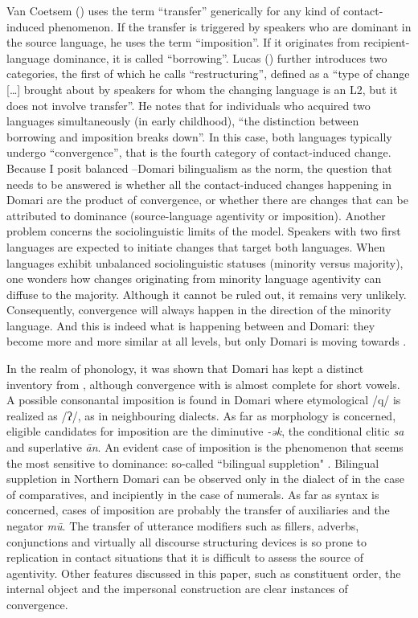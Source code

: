 \documentclass[output=paper]{langsci/langscibook}
\begin{document}
Van Coetsem (\citeyear{VanCoetsem1988,VanCoetsem2000}) uses the term “{transfer}” generically for any kind of contact-induced phenomenon. If the {transfer} is triggered by speakers who are dominant in the {source language}, he uses the term “{imposition}”. If it originates from {recipient-language} dominance, it is called “borrowing”. Lucas (\citeyear[525]{Lucas2015}) further introduces two categories, the first of which he calls ``restructuring'', defined as a “type of change […] brought about by speakers for whom the changing language is an L2, but it does not involve {transfer}”.  He notes that for individuals who acquired two languages simultaneously (in early childhood), “the distinction between borrowing and {imposition} breaks down”. In this case, both languages typically undergo ``{convergence}'', that is the fourth category of contact-induced change. Because I posit balanced --Domari {bilingualism} as the norm, the question that needs to be answered is whether all the contact-induced changes happening in Domari are the product of {convergence}, or whether there are changes that can be attributed to  dominance ({source-language} agentivity or {imposition}). Another problem concerns the sociolinguistic limits of the model. Speakers with two first languages are expected to initiate changes that target both languages. When languages exhibit unbalanced sociolinguistic statuses (minority versus majority), one wonders how changes originating from minority language agentivity can diffuse to the majority. Although it cannot be ruled out, it remains very unlikely. Consequently, {convergence} will always happen in the direction of the minority language. And this is indeed what is happening between  and Domari: they become more and more similar at all levels, but only Domari is moving towards .

In the realm of phonology, it was shown that Domari has kept a distinct inventory from , although {convergence} with  is almost complete for short vowels. A possible consonantal {imposition} is found in  Domari where etymological /q/ is realized as /ʔ/, as in neighbouring  dialects. As far as morphology is concerned, eligible candidates for {imposition} are the  {diminutive} \textit{{}-ək}, the  {conditional} {clitic} \textit{sa} and {superlative} \textit{ān}. An evident case of {imposition} is the phenomenon that seems the most sensitive to dominance: so-called ``{bilingual suppletion}" \citep{Matras2012}. Bilingual suppletion in Northern Domari can be observed only in the dialect of  in the case of comparatives, and incipiently in the case of {numerals}. As far as syntax is concerned, cases of {imposition} are probably the {transfer} of  auxiliaries and the negator \textit{mū}. The {transfer} of utterance modifiers such as fillers, adverbs, conjunctions and virtually all discourse structuring devices is so prone to {replication} in contact situations \citep{Matras1998} that it is difficult to assess the source of agentivity. Other features discussed in this paper, such as {constituent order}, the {internal object} and the {impersonal construction} are clear instances of {convergence}.
\end{document}
